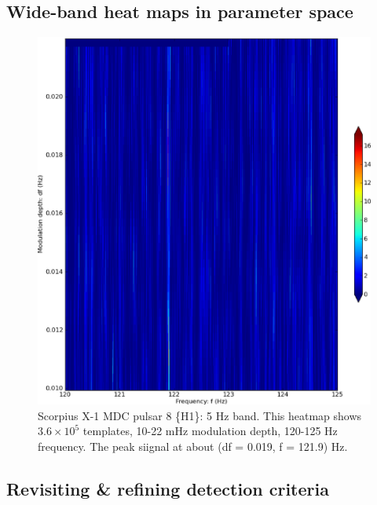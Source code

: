 
\subsection{Wide-band heat maps in parameter space}


\begin{figure}
\begin{center}
\includegraphics[width=0.8\paperwidth,height=0.62\paperheight]{bandH1.eps}
\caption{Scorpius X-1 MDC pulsar 8 \{H1\}: 5 Hz band. This heatmap shows $3.6\times10^{5}$ templates, 10-22 mHz modulation depth, 120-125 Hz frequency. The peak siignal at about (df = 0.019, f = 121.9) Hz.
}
\end{center}
\end{figure}



\subsection{Revisiting \& refining detection criteria}


